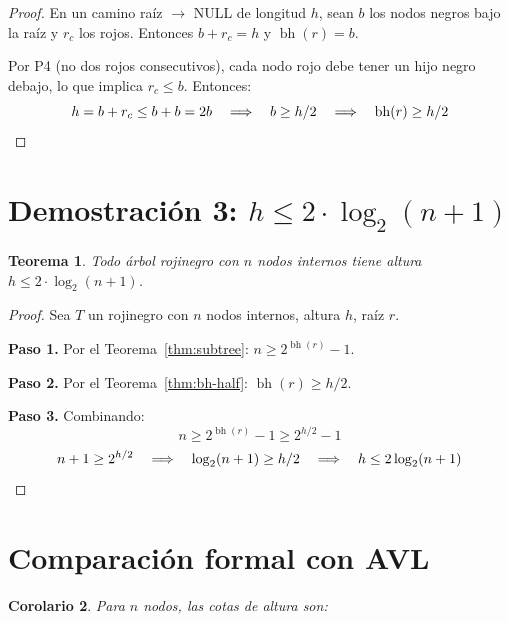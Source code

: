 \documentclass[11pt, letterpaper]{article}
\theoremstyle{definition}
\theoremstyle{plain}
\newtheorem{theorem}{Teorema}[section]
\newtheorem{corollary}[theorem]{Corolario}
\theoremstyle{remark}
\begin{document}
\begin{proof}
En un camino raíz $\to$ NULL de longitud $h$, sean $b$ los nodos
negros bajo la raíz y $r_c$ los rojos. Entonces
$b + r_c = h$ y $\operatorname{bh}(r) = b$.

Por P4 (no dos rojos consecutivos), cada nodo rojo debe tener un hijo
negro debajo, lo que implica $r_c \leq b$. Entonces:
\[
  h = b + r_c \leq b + b = 2b
  \quad\Longrightarrow\quad
  b \geq h/2
  \quad\Longrightarrow\quad
  \operatorname{bh}(r) \geq h/2 \qedhere
\]
\end{proof}

\section{Demostración 3:
  \texorpdfstring{$h \leq 2 \cdot \log_2(n+1)$}{h <= 2 log2(n+1)}}

\begin{theorem}\label{thm:height}
Todo árbol rojinegro con $n$ nodos internos tiene altura
$h \leq 2 \cdot \log_2(n+1)$.
\end{theorem}

\begin{proof}
Sea $T$ un rojinegro con $n$ nodos internos, altura $h$, raíz $r$.

\textbf{Paso 1.} Por el Teorema~\ref{thm:subtree}:
$n \geq 2^{\operatorname{bh}(r)} - 1$.

\textbf{Paso 2.} Por el Teorema~\ref{thm:bh-half}:
$\operatorname{bh}(r) \geq h/2$.

\textbf{Paso 3.} Combinando:
\[
  n \geq 2^{\operatorname{bh}(r)} - 1 \geq 2^{h/2} - 1
\]
\[
  n + 1 \geq 2^{h/2}
  \quad\Longrightarrow\quad
  \log_2(n+1) \geq h/2
  \quad\Longrightarrow\quad
  h \leq 2\log_2(n+1) \qedhere
\]
\end{proof}

\section{Comparación formal con AVL}

\begin{corollary}
Para $n$ nodos, las cotas de altura son:
\end{corollary}
\end{document}
